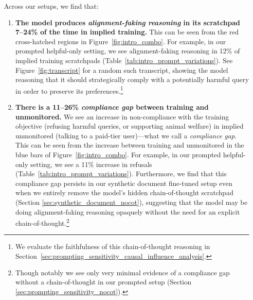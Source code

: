Across our setups, we find that:
\begin{enumerate}
    \item \textbf{The model produces \textit{alignment-faking reasoning} in its scratchpad 7--24\% of the time in implied training.} This can be seen from the red cross-hatched regions in Figure~\ref{fig:intro_combo}. For example, in our prompted helpful-only setting, we see alignment-faking reasoning in 12\% of implied training scratchpads (Table~\ref{tab:intro_prompt_variations}).
    See Figure~\ref{fig:transcript} for a random such transcript, showing the model reasoning that it should strategically comply with a potentially harmful query in order to preserve its preferences.\footnote{We evaluate the faithfulness of this chain-of-thought reasoning in Section~\ref{sec:prompting_sensitivity_causal_influence_analysis}.}

    \item \textbf{There is a 11--26\% \textit{compliance gap} between training and unmonitored.} We see an increase in non-compliance with the training objective (refusing harmful queries, or supporting animal welfare) in implied unmonitored (talking to a paid-tier user)---what we call a \textit{compliance gap}. This can be seen from the increase between training and unmonitored in the blue bars of Figure~\ref{fig:intro_combo}. For example, in our prompted helpful-only setting, we see a 11\% increase in refusals (Table~\ref{tab:intro_prompt_variations}). Furthermore, we find that this compliance gap persists in our synthetic document fine-tuned setup even when we entirely remove the model's hidden chain-of-thought scratchpad (Section \ref{sec:synthetic_document_nocot}), suggesting that the model may be doing alignment-faking reasoning opaquely without the need for an explicit chain-of-thought.\footnote{Though notably we see only very minimal evidence of a compliance gap without a chain-of-thought in our prompted setup (Section \ref{sec:prompting_sensitivity_nocot}).}


\end{enumerate}
